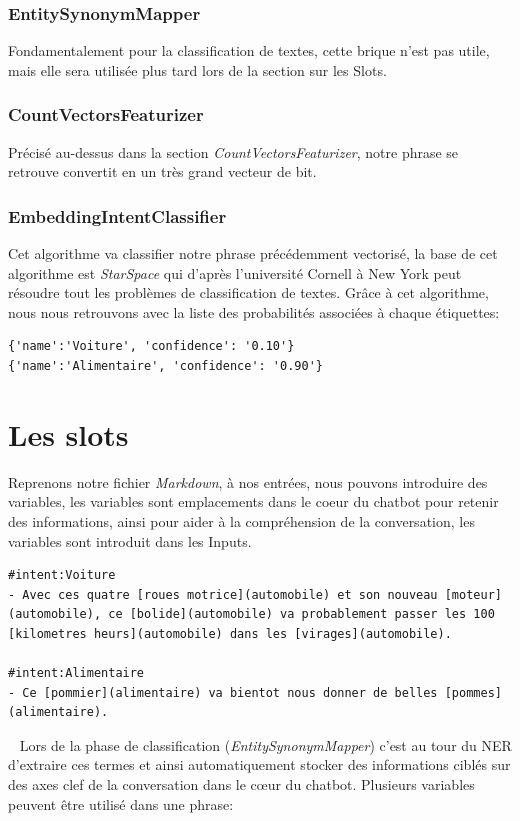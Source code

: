 \subsubsection{EntitySynonymMapper}
Fondamentalement pour la classification de textes, cette brique n'est pas utile, mais elle sera utilisée plus tard lors de la section sur les Slots.

\subsubsection{CountVectorsFeaturizer}
Précisé au-dessus dans la section \textit{CountVectorsFeaturizer}, notre phrase se retrouve convertit en un très grand vecteur de bit.

\subsubsection{EmbeddingIntentClassifier}
Cet algorithme va classifier notre phrase précédemment vectorisé, la base de cet algorithme est \textit{StarSpace} qui d'après l'université Cornell à New York peut résoudre tout les problèmes de classification de textes.\linebreak
Grâce à cet algorithme, nous nous retrouvons avec la liste des probabilités associées à chaque étiquettes:

\begin{lstlisting}
{'name':'Voiture', 'confidence': '0.10'}
{'name':'Alimentaire', 'confidence': '0.90'}
\end{lstlisting}

\pagebreak
\section{Les slots}

Reprenons notre fichier \textit{Markdown}, à nos entrées, nous pouvons introduire des variables, les variables sont emplacements dans le coeur du chatbot pour retenir des informations, ainsi pour aider à la compréhension de la conversation, les variables sont introduit dans les Inputs.
\ \linebreak
\begin{lstlisting}
#intent:Voiture
- Avec ces quatre [roues motrice](automobile) et son nouveau [moteur](automobile), ce [bolide](automobile) va probablement passer les 100 [kilometres heurs](automobile) dans les [virages](automobile).

#intent:Alimentaire
- Ce [pommier](alimentaire) va bientot nous donner de belles [pommes](alimentaire).
\end{lstlisting}
\ \linebreak
Lors de la phase de classification (\textit{EntitySynonymMapper}) c'est au tour du NER d'extraire ces termes et ainsi automatiquement stocker des informations ciblés sur des axes clef de la conversation dans le cœur du chatbot. Plusieurs variables peuvent être utilisé dans une phrase:

